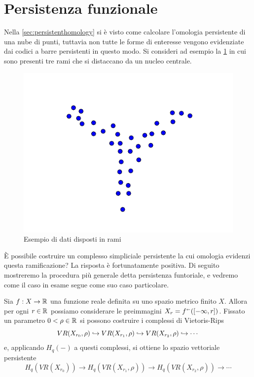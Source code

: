 \section{Persistenza funzionale}

Nella \cref{sec:persistenthomology} si è visto come calcolare l'omologia persistente di una nube di punti, tuttavia non tutte le forme di enteresse vengono evidenziate dai codici a barre persistenti in questo modo. Si consideri ad esempio la \cref{fig:threeflares} in cui sono presenti tre rami che si distaccano da un nucleo centrale.

\begin{figure}[ht]
  \includegraphics[width=.7\linewidth]{gfx/functional_all.pdf}
  \caption{Esempio di dati disposti in rami}
  \label{fig:threeflares}
\end{figure}

\`E possibile costruire un complesso simpliciale persistente la cui omologia evidenzi questa ramificazione? La risposta è fortunatamente positiva. Di seguito mostreremo la procedura più generale detta persistenza funtoriale, e vedremo come il caso in esame segue come suo caso particolare.

Sia $f:X\to \mathbb{R}$ una funzione reale definita su uno spazio metrico finito $X$. Allora per ogni $r\in \mathbb{R}$ possiamo considerare le preimmagini $X_r=f^{\shortleftarrow}([-\infty,r])$. Fissato un parametro $0<\rho\in \mathbb{R}$ si possono costruire i complessi di Vietoris-Rips
\begin{equation*}
  VR(X_{r_0},\rho)\hookrightarrow VR(X_{r_1},\rho)\hookrightarrow VR(X_{r_2},\rho)\hookrightarrow \cdots
\end{equation*}
e, applicando $H_q(-)$ a questi complessi, si ottiene lo spazio vettoriale persistente
\begin{equation*}
  H_q(VR(X_{r_0}))\to H_q(VR(X_{r_1},\rho))\to H_q(VR(X_{r_2},\rho))\to \cdots
\end{equation*}

